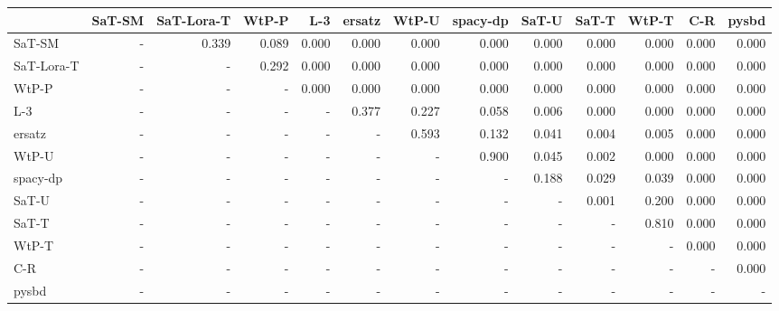 \begin{tabular}{lrrrrrrrrrrrr}
\toprule
 & SaT-SM & SaT-Lora-T & WtP-P & L-3 & ersatz & WtP-U & spacy-dp & SaT-U & SaT-T & WtP-T & C-R & pysbd \\
\midrule
SaT-SM & - & 0.339 & 0.089 & 0.000 & 0.000 & 0.000 & 0.000 & 0.000 & 0.000 & 0.000 & 0.000 & 0.000 \\
SaT-Lora-T & - & - & 0.292 & 0.000 & 0.000 & 0.000 & 0.000 & 0.000 & 0.000 & 0.000 & 0.000 & 0.000 \\
WtP-P & - & - & - & 0.000 & 0.000 & 0.000 & 0.000 & 0.000 & 0.000 & 0.000 & 0.000 & 0.000 \\
L-3 & - & - & - & - & 0.377 & 0.227 & 0.058 & 0.006 & 0.000 & 0.000 & 0.000 & 0.000 \\
ersatz & - & - & - & - & - & 0.593 & 0.132 & 0.041 & 0.004 & 0.005 & 0.000 & 0.000 \\
WtP-U & - & - & - & - & - & - & 0.900 & 0.045 & 0.002 & 0.000 & 0.000 & 0.000 \\
spacy-dp & - & - & - & - & - & - & - & 0.188 & 0.029 & 0.039 & 0.000 & 0.000 \\
SaT-U & - & - & - & - & - & - & - & - & 0.001 & 0.200 & 0.000 & 0.000 \\
SaT-T & - & - & - & - & - & - & - & - & - & 0.810 & 0.000 & 0.000 \\
WtP-T & - & - & - & - & - & - & - & - & - & - & 0.000 & 0.000 \\
C-R & - & - & - & - & - & - & - & - & - & - & - & 0.000 \\
pysbd & - & - & - & - & - & - & - & - & - & - & - & - \\
\bottomrule
\end{tabular}

